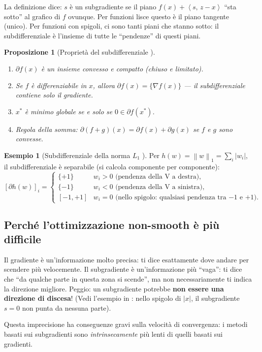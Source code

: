 \documentclass[a4paper,11pt]{article}
\newtheorem{proposition}[theorem]{Proposizione}
\theoremstyle{definition}
\newtheorem{example}[theorem]{Esempio}
\newcommand{\norm}[1]{\left\lVert #1 \right\rVert}
\newcommand{\inner}[2]{\left\langle #1,\, #2 \right\rangle}
\begin{document}
\begin{intuizione}
La definizione dice: $s$ è un subgradiente se il piano $f(x) + \inner{s}{z-x}$ ``sta sotto'' al grafico di $f$ ovunque. Per funzioni lisce questo è il piano tangente (unico). Per funzioni con spigoli, ci sono tanti piani che stanno sotto: il subdifferenziale è l'insieme di tutte le ``pendenze'' di questi piani.
\end{intuizione}

\begin{proposition}[Proprietà del subdifferenziale {\cite[slide~5--7, set~5]{opt-slides}}]
\mbox{}
\begin{enumerate}[nosep]
  \item $\partial f(x)$ è un insieme convesso e compatto (chiuso e limitato).
  \item Se $f$ è differenziabile in $x$, allora $\partial f(x) = \{\nabla f(x)\}$ --- il subdifferenziale contiene solo il gradiente.
  \item $x^*$ è minimo globale se e solo se $0 \in \partial f(x^*)$.
  \item Regola della somma: $\partial(f+g)(x) = \partial f(x) + \partial g(x)$ se $f$ e $g$ sono convesse.
\end{enumerate}
\end{proposition}

\begin{example}[Subdifferenziale della norma $L_1$ {\cite[slide~7, set~5]{opt-slides}}]
Per $h(w) = \norm{w}_1 = \sum_i |w_i|$, il subdifferenziale è separabile (si calcola componente per componente):
\[
  [\partial h(w)]_i = \begin{cases} \{+1\} & w_i > 0 \text{ (pendenza della V a destra)},\\ \{-1\} & w_i < 0 \text{ (pendenza della V a sinistra)},\\ [-1,+1] & w_i = 0 \text{ (nello spigolo: qualsiasi pendenza tra $-1$ e $+1$)}. \end{cases}
\]
\end{example}

\subsection{Perché l'ottimizzazione non-smooth è più difficile}
\label{subsec:nonsmooth_hard}

\begin{intuizione}
Il gradiente è un'informazione molto precisa: ti dice esattamente dove andare per scendere più velocemente. Il subgradiente è un'informazione più ``vaga'': ti dice che ``da qualche parte in questa zona si scende'', ma non necessariamente ti indica la direzione migliore. Peggio: un subgradiente potrebbe \textbf{non essere una direzione di discesa}! (Vedi l'esempio in \cite[\S5.1.2]{opt-notes}: nello spigolo di $|x|$, il subgradiente $s = 0$ non punta da nessuna parte).

Questa imprecisione ha conseguenze gravi sulla velocità di convergenza: i metodi basati sui subgradienti sono \emph{intrinsecamente} più lenti di quelli basati sui gradienti.
\end{intuizione}
\end{document}
